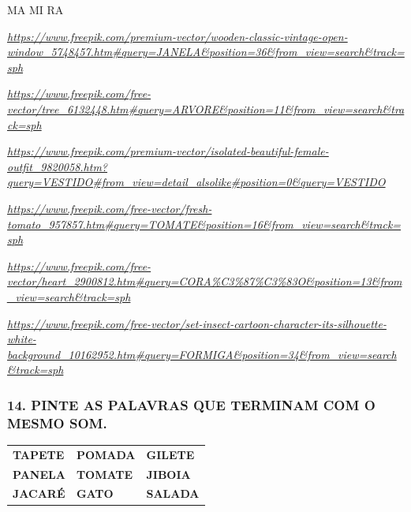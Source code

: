 MA MI RA

\href{https://www.freepik.com/premium-vector/wooden-classic-vintage-open-window_5748457.htm\#query=JANELA\&position=36\&from_view=search\&track=sph}{\emph{https://www.freepik.com/premium-vector/wooden-classic-vintage-open-window\_5748457.htm\#query=JANELA\&position=36\&from\_view=search\&track=sph}}

\href{https://www.freepik.com/free-vector/tree_6132448.htm\#query=ARVORE\&position=11\&from_view=search\&track=sph}{\emph{https://www.freepik.com/free-vector/tree\_6132448.htm\#query=ARVORE\&position=11\&from\_view=search\&track=sph}}

\href{https://www.freepik.com/premium-vector/isolated-beautiful-female-outfit_9820058.htm?query=VESTIDO\#from_view=detail_alsolike}{\emph{https://www.freepik.com/premium-vector/isolated-beautiful-female-outfit\_9820058.htm?query=VESTIDO\#from\_view=detail\_alsolike\#position=0\&query=VESTIDO}}

\href{https://www.freepik.com/free-vector/fresh-tomato_957857.htm\#query=TOMATE\&position=16\&from_view=search\&track=sph}{\emph{https://www.freepik.com/free-vector/fresh-tomato\_957857.htm\#query=TOMATE\&position=16\&from\_view=search\&track=sph}}

\href{https://www.freepik.com/free-vector/heart_2900812.htm\#query=CORA\%C3\%87\%C3\%83O\&position=13\&from_view=search\&track=sph}{\emph{https://www.freepik.com/free-vector/heart\_2900812.htm\#query=CORA\%C3\%87\%C3\%83O\&position=13\&from\_view=search\&track=sph}}

\href{https://www.freepik.com/free-vector/set-insect-cartoon-character-its-silhouette-white-background_10162952.htm\#query=FORMIGA\&position=34\&from_view=search\&track=sph}{\emph{https://www.freepik.com/free-vector/set-insect-cartoon-character-its-silhouette-white-background\_10162952.htm\#query=FORMIGA\&position=34\&from\_view=search\&track=sph}}

\subsubsection{14. PINTE AS PALAVRAS QUE TERMINAM COM O MESMO
SOM.}\label{pinte-as-palavras-que-terminam-com-o-mesmo-som.}

\begin{longtable}[]{@{}lll@{}}
\toprule
\textbf{TAPETE} & \textbf{POMADA} & \textbf{GILETE}\tabularnewline
\textbf{PANELA} & \textbf{TOMATE} & \textbf{JIBOIA}\tabularnewline
\textbf{JACARÉ} & \textbf{GATO} & \textbf{SALADA}\tabularnewline
\bottomrule
\end{longtable}

